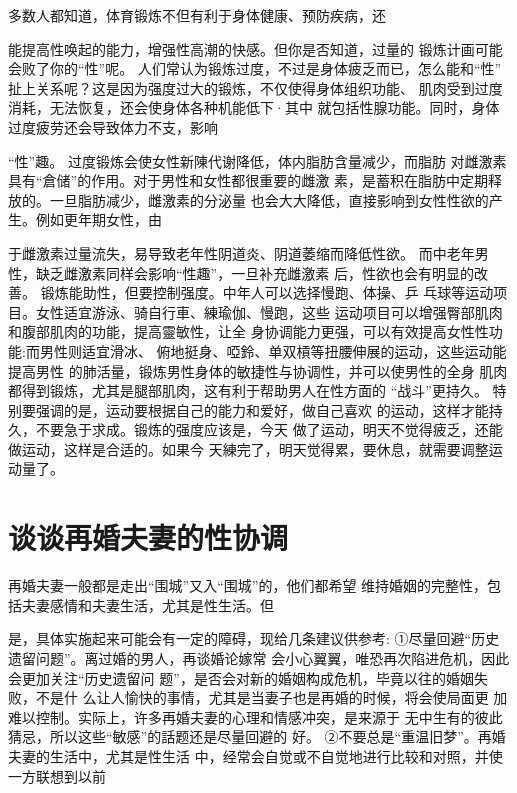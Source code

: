 \documentclass[12pt,UTF8]{ctexbook}
\begin{document}
多数人都知道，体育锻炼不但有利于身体健康、预防疾病，还

能提高性唤起的能力，增强性高潮的快感。但你是否知道，过量的
锻炼计画可能会败了你的“性”呢。
人们常认为锻炼过度，不过是身体疲乏而已，怎么能和“性”
扯上关系呢？这是因为强度过大的锻炼，不仅使得身体组织功能、
肌肉受到过度消耗，无法恢复，还会使身体各种机能低下·其中
就包括性腺功能。同时，身体过度疲劳还会导致体力不支，影响

“性”趣。
过度锻炼会使女性新陳代谢降低，体内脂肪含量减少，而脂肪
对雌激素具有“倉储”的作用。对于男性和女性都很重要的雌激
素，是蓄积在脂肪中定期释放的。一旦脂肪减少，雌激素的分泌量
也会大大降低，直接影响到女性性欲的产生。例如更年期女性，由

于雌激素过量流失，易导致老年性阴道炎、阴道萎缩而降低性欲。
而中老年男性，缺乏雌激素同样会影响“性趣”，一旦补充雌激素
后，性欲也会有明显的改善。
锻炼能助性，但要控制强度。中年人可以选择慢跑、体操、乒
乓球等运动项目。女性适宜游泳、骑自行車、練瑜伽、慢跑，这些
运动项目可以增强臀部肌肉和腹部肌肉的功能，提高靈敏性，让全
身协调能力更强，可以有效提高女性性功能:而男性则适宜滑冰、
俯地挺身、啞鈴、单双槓等扭腰伸展的运动，这些运动能提高男性
的肺活量，锻炼男性身体的敏捷性与协调性，并可以使男性的全身
肌肉都得到锻炼，尤其是腿部肌肉，这有利于帮助男人在性方面的
“战斗”更持久。
特别要强调的是，运动要根据自己的能力和爱好，做自己喜欢
的运动，这样才能持久，不要急于求成。锻炼的强度应该是，今天
做了运动，明天不觉得疲乏，还能做运动，这样是合适的。如果今
天練完了，明天觉得累，要休息，就需要调整运动量了。

\section{谈谈再婚夫妻的性协调}

再婚夫妻一般都是走出“围城”又入“围城”的，他们都希望
维持婚姻的完整性，包括夫妻感情和夫妻生活，尤其是性生活。但

是，具体实施起来可能会有一定的障碍，现给几条建议供参考:
①尽量回避“历史遗留问题”。离过婚的男人，再谈婚论嫁常
会小心翼翼，唯恐再次陷进危机，因此会更加关注“历史遗留问
题”，是否会对新的婚姻构成危机，毕竟以往的婚姻失败，不是什
么让人愉快的事情，尤其是当妻子也是再婚的时候，将会使局面更
加难以控制。实际上，许多再婚夫妻的心理和情感冲突，是来源于
无中生有的彼此猜忌，所以这些“敏感”的話题还是尽量回避的
好。
②不要总是“重温旧梦”。再婚夫妻的生活中，尤其是性生活
中，经常会自觉或不自觉地进行比较和对照，并使一方联想到以前
\end{document}
